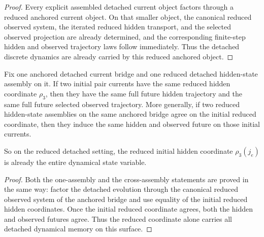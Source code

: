 \begin{proof}
Every explicit assembled detached current object factors through a reduced
anchored current object. On that smaller object, the canonical reduced
observed system, the iterated reduced hidden transport, and the selected
observed projection are already determined, and the corresponding finite-step
hidden and observed trajectory laws follow immediately. Thus the detached
discrete dynamics are already carried by this reduced anchored object.
\end{proof}

\begin{corollary}
\label{thm:at-the-reduced-hidden-state-level-the-initial-reduced-coordinate-is-the-full-detached-state}
Fix one anchored detached current bridge and one reduced detached hidden-state
assembly on it. If two initial pair currents have the same reduced hidden
coordinate \(\rho_3\), then they have the same full future hidden trajectory
and the same full future selected observed trajectory. More generally, if two
reduced hidden-state assemblies on the same anchored bridge agree on the
initial reduced coordinate, then they induce the same hidden and observed
future on those initial currents.

So on the reduced detached setting, the reduced initial hidden coordinate
\(\rho_3(j_e)\) is already the entire dynamical state variable.
\end{corollary}

\begin{proof}
Both the one-assembly and the cross-assembly statements are proved in the same
way: factor the detached evolution through the canonical reduced observed
system of the anchored bridge and use equality of the initial reduced hidden
coordinates. Once the initial reduced coordinate agrees, both the hidden and
observed futures agree. Thus the reduced coordinate alone carries all detached
dynamical memory on this surface.
\end{proof}

